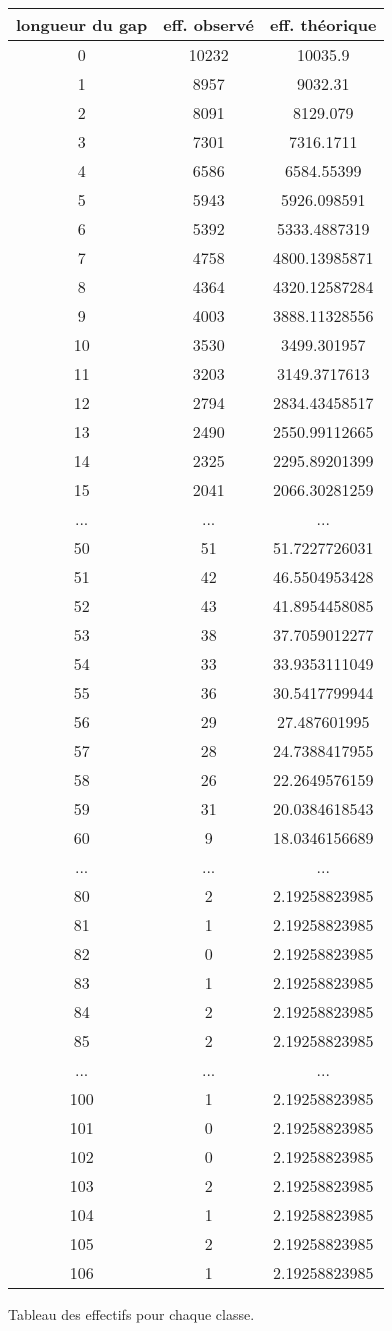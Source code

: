 \documentclass[a4paper,10pt]{article}
\begin{document}
\begin{figure}[h!]
\begin{center}
\begin{tabular}{|c|c|c|}
\hline
longueur du gap & eff. observé & eff. théorique \\
\hline
0 & 10232 & 10035.9\\
1 & 8957 & 9032.31\\
2 & 8091 & 8129.079\\
3 & 7301 & 7316.1711\\
4 & 6586 & 6584.55399\\
5 & 5943 & 5926.098591\\
6 & 5392 & 5333.4887319\\
7 & 4758 & 4800.13985871\\
8 & 4364 & 4320.12587284\\
9 & 4003 & 3888.11328556\\
10 & 3530 & 3499.301957\\
11 & 3203 & 3149.3717613\\
12 & 2794 & 2834.43458517\\
13 & 2490 & 2550.99112665\\
14 & 2325 & 2295.89201399\\
15 & 2041 & 2066.30281259\\
... & ... & ... \\
50 & 51 & 51.7227726031\\
51 & 42 & 46.5504953428\\
52 & 43 & 41.8954458085\\
53 & 38 & 37.7059012277\\
54 & 33 & 33.9353111049\\
55 & 36 & 30.5417799944\\
56 & 29 & 27.487601995\\
57 & 28 & 24.7388417955\\
58 & 26 & 22.2649576159\\
59 & 31 & 20.0384618543\\
60 & 9 & 18.0346156689\\
... & ... & ... \\
80 & 2 & 2.19258823985\\
81 & 1 & 2.19258823985\\
82 & 0 & 2.19258823985\\
83 & 1 & 2.19258823985\\
84 & 2 & 2.19258823985\\
85 & 2 & 2.19258823985\\
... & ... & ...\\
100 & 1 & 2.19258823985\\
101 & 0 & 2.19258823985\\
102 & 0 & 2.19258823985\\
103 & 2 & 2.19258823985\\
104 & 1 & 2.19258823985\\
105 & 2 & 2.19258823985\\
106 & 1 & 2.19258823985\\
\hline
\end{tabular}
\end{center}
\caption{Tableau des effectifs pour chaque classe.}
\end{figure}
\end{document}
